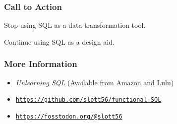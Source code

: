 \documentclass{beamer}
\begin{document}
\begin{frame}
    \frametitle{Call to Action}
    Stop using SQL as a data transformation tool.

    \vspace{1em}
    Continue using SQL as a design aid.
\end{frame}

\begin{frame}
    \frametitle{More Information}

    \begin{itemize}
        \item \textit{Unlearning SQL} (Available from Amazon and Lulu) \vspace{1em}
        \item \texttt{\underline{https://github.com/slott56/functional-SQL}} \vspace{1em}
        \item \texttt{\underline{https://fosstodon.org/@slott56}}
    \end{itemize}
\end{frame}
\end{document}
